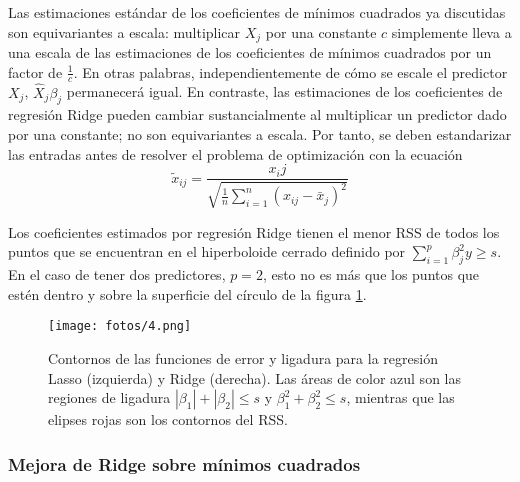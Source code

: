 Las estimaciones estándar de los coeficientes de mínimos cuadrados ya discutidas son equivariantes a escala: multiplicar $X_j$ por una constante $c$ simplemente lleva a una escala de las estimaciones de los coeficientes de mínimos cuadrados por un factor de $\frac{1}{c}$. En otras palabras, independientemente de cómo se escale el predictor $X_j$, $\hat{X}_j \beta_j$ permanecerá igual. En contraste, las estimaciones de los coeficientes de regresión Ridge pueden cambiar sustancialmente al multiplicar un predictor dado por una constante; no son equivariantes a escala. Por tanto, se deben estandarizar las entradas antes de resolver el problema de optimización con la ecuación 
\begin{equation}
\tilde{x}_{ij} = \frac{x_ij}{\sqrt{\frac{1}{n} \sum_{i=1}^n (x_{ij} - \bar{x}_j)^2}}
\end{equation}

Los coeficientes estimados por regresión Ridge tienen el menor RSS de todos los puntos que se encuentran en el hiperboloide cerrado definido por $\sum_{i=1}^p \beta_j^2y \geq s$. En el caso de tener dos predictores, $p=2$, esto no es más que los puntos que estén dentro y sobre la superficie del círculo de la figura \ref{fig:reg}.  

\begin{figure}[h]
\centering
\texttt{[image: fotos/4.png]}
\caption{Contornos de las funciones de error y ligadura para la regresión Lasso (izquierda) y Ridge (derecha). Las áreas de color azul son las regiones de ligadura $|\beta_1| + |\beta_2| \leq s$ y $\beta_1^2 + \beta_2^2 \leq s$, mientras que las elipses rojas son los contornos del RSS.}
\label{fig:reg}
\end{figure}

\subsubsection{Mejora de Ridge sobre mínimos cuadrados}


